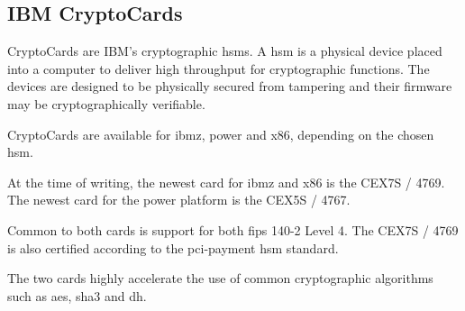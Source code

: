 
\subsection{IBM CryptoCards}

CryptoCards are IBM's cryptographic \glspl{hsm}. A \gls{hsm} is a physical device placed into a computer to deliver high throughput for cryptographic functions. The devices are designed to be physically secured from tampering and their firmware may be cryptographically verifiable\cite{ibm:hsms}.

CryptoCards are available for \gls{ibmz}, \gls{power} and \gls{x86}, depending on the chosen \gls{hsm}.

At the time of writing, the newest card for \gls{ibmz} and \gls{x86} is the CEX7S / 4769\cite{ibm:4769}. The newest card for the \gls{power} platform is the CEX5S / 4767\cite{ibm:4767}.

Common to both cards is support for both \gls{fips} 140-2 Level 4. The CEX7S / 4769 is also certified according to the \gls{pci-payment} \gls{hsm} standard\cite{ibm:4769,ibm:4767}.

The two cards highly accelerate the use of common cryptographic algorithms such as \gls{aes}, \gls{sha3} and \gls{dh}\cite{ibm:4767,ibm:4769}.